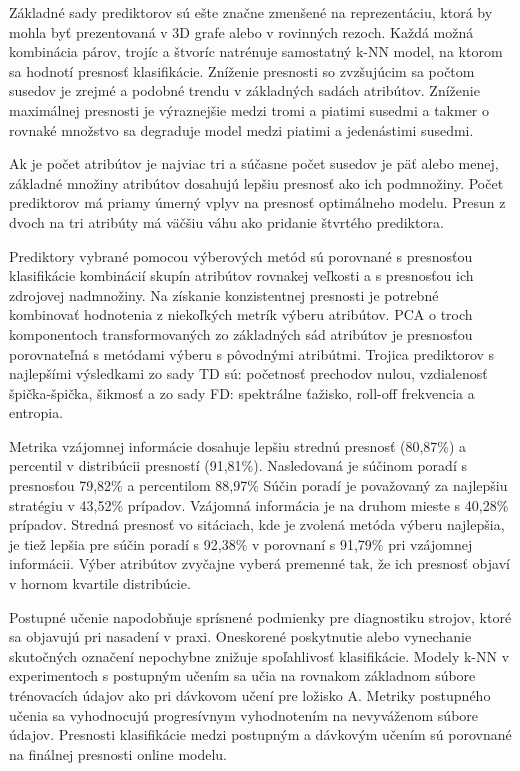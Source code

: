 Základné sady prediktorov sú ešte značne zmenšené na reprezentáciu, ktorá by mohla byť prezentovaná v 3D grafe alebo v rovinných rezoch. Každá možná kombinácia párov, trojíc a štvoríc natrénuje samostatný k-NN model, na ktorom sa hodnotí presnosť klasifikácie. Zníženie presnosti so zvzšujúcim sa počtom susedov je zrejmé a podobné trendu v základných sadách atribútov. Zníženie maximálnej presnosti je výraznejšie medzi tromi a piatimi susedmi a takmer o rovnaké množstvo sa degraduje model medzi piatimi a jedenástimi susedmi. 

Ak je počet atribútov je najviac tri a súčasne počet susedov je päť alebo menej, základné množiny atribútov dosahujú lepšiu presnosť ako ich podmnožiny.
Počet prediktorov má priamy úmerný vplyv na presnosť optimálneho modelu. Presun z dvoch na tri atribúty má väčšiu váhu ako pridanie štvrtého prediktora. 

Prediktory vybrané pomocou výberových metód sú porovnané s presnosťou klasifikácie kombinácií skupín atribútov rovnakej veľkosti a s presnosťou ich zdrojovej nadmnožiny. Na získanie konzistentnej presnosti je potrebné kombinovať hodnotenia z niekoľkých metrík výberu atribútov. PCA o troch komponentoch transformovaných zo základných sád atribútov je presnosťou porovnateľná s metódami výberu s pôvodnými atribútmi. Trojica prediktorov s najlepšími výsledkami zo sady TD sú: početnosť prechodov nulou, vzdialenosť špička-špička, šikmosť a zo sady FD: spektrálne ťažisko, roll-off frekvencia a entropia.

Metrika vzájomnej informácie dosahuje lepšiu strednú presnosť (80,87\%) a percentil v distribúcii presností (91,81\%). Nasledovaná je súčinom poradí s presnosťou 79,82\% a percentilom 88,97\% Súčin poradí je považovaný za najlepšiu stratégiu v 43,52\% prípadov. Vzájomná informácia je na druhom mieste s 40,28\% prípadov. Stredná presnosť vo sitáciach, kde je zvolená metóda výberu najlepšia, je tiež lepšia pre súčin poradí s 92,38\% v porovnaní s 91,79\% pri vzájomnej informácii. Výber atribútov zvyčajne vyberá premenné tak, že ich presnosť objaví v hornom kvartile distribúcie.

Postupné učenie napodobňuje sprísnené podmienky pre diagnostiku strojov, ktoré sa objavujú pri nasadení v praxi. Oneskorené poskytnutie alebo vynechanie skutočných označení nepochybne znižuje spoľahlivosť klasifikácie. Modely k-NN v experimentoch s postupným učením sa učia na rovnakom základnom súbore trénovacích údajov ako pri dávkovom učení pre ložisko A. Metriky postupného učenia sa vyhodnocujú progresívnym vyhodnotením na nevyváženom súbore údajov. Presnosti klasifikácie medzi postupným a dávkovým učením sú porovnané na finálnej presnosti online modelu. 

